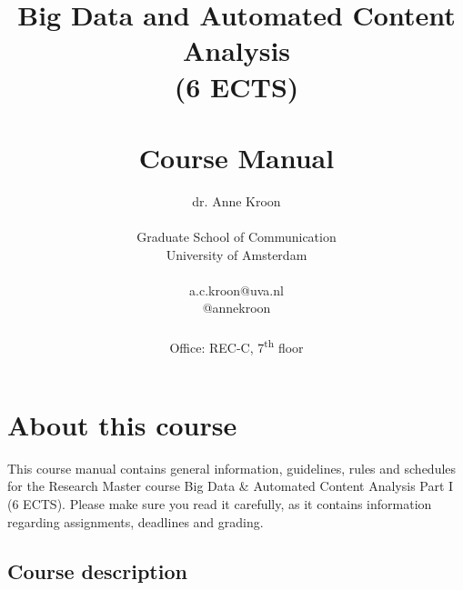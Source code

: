 \documentclass[a4paper,10pt,twocolumn]{report}
\title{Big Data and Automated Content Analysis\\ (6 ECTS)\\~\\Course Manual}
\author{dr. Anne Kroon\\~\\Graduate School of Communication\\University of Amsterdam\\~\\a.c.kroon@uva.nl \\@annekroon \\~\\Office: REC-C, 7\textsuperscript{th} floor}
\date{Academic Year 2020/21\\Semester 2, block  2\\ 
\begin{corona} Coronavirus-Pandemic Online Edition\end{corona}
}
\begin{document}
\maketitle



\chapter{About this course}

This course manual contains general information, guidelines, rules and schedules for the Research Master course Big Data \& Automated Content Analysis Part I (6 ECTS). Please make sure you read it carefully, as it  contains information regarding assignments, deadlines and grading.

\section{Course description}


\end{document}
